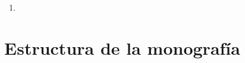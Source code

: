 \begin{enumerate}
	
	\item 
	
	
	
	
	
	
	
	

\end{enumerate}


\section{Estructura de la monografía}


